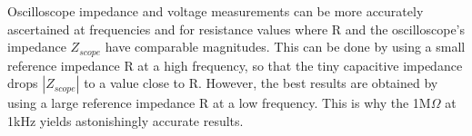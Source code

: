 Oscilloscope impedance and voltage measurements can be more accurately ascertained at frequencies and for resistance values where R and the oscilloscope's impedance $Z_{scope}$ have comparable magnitudes. This can be done by using a small reference impedance R at a high frequency, so that the tiny capacitive impedance drops $|Z_{scope}|$ to a value close to R. However, the best results are obtained by using a large reference impedance R at a low frequency. This is why the 1M$\Omega$ at 1kHz yields astonishingly accurate results.
